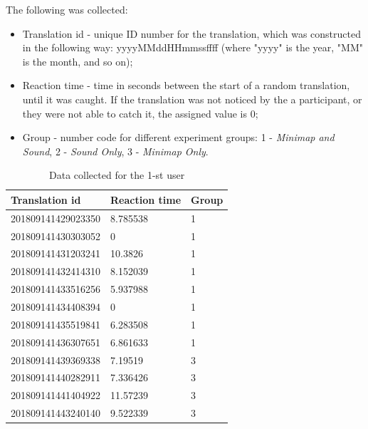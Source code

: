 The following was collected:
\begin{itemize}
	\item Translation id - unique ID number for the translation, which was constructed in the following way: yyyyMMddHHmmssffff (where "yyyy" is the year, "MM" is the month, and so on);
	\item Reaction time - time in seconds between the start of a random translation, until it was caught. If the translation was not noticed by the a participant, or they were not able to catch it, the assigned value is 0;
	\item Group - number code for different experiment groups: 1 - \textit{Minimap and Sound}, 2 - \textit{Sound Only}, 3 - \textit{Minimap Only}.
\end{itemize}

\begin{table}[]
	\centering
	\caption{Data collected for the 1-st user}
	\label{tab:finalstudy_datacollected}
	\begin{tabular}{|l|l|l|}
		\hline
		\textbf{Translation id} & \textbf{Reaction time} & \textbf{Group} \\ \hline
		201809141429023350      & 8.785538               & 1              \\ \hline
		201809141430303052      & 0                      & 1              \\ \hline
		201809141431203241      & 10.3826                & 1              \\ \hline
		201809141432414310      & 8.152039               & 1              \\ \hline
		201809141433516256      & 5.937988               & 1              \\ \hline
		201809141434408394      & 0                      & 1              \\ \hline
		201809141435519841      & 6.283508               & 1              \\ \hline
		\rowcolor[HTML]{FFCC67} 
		201809141436307651      & 6.861633               & 1              \\ \hline
		201809141439369338      & 7.19519                & 3              \\ \hline
		201809141440282911      & 7.336426               & 3              \\ \hline
		201809141441404922      & 11.57239               & 3              \\ \hline
		201809141443240140      & 9.522339               & 3              \\ \hline

\end{tabular}
\end{table}
